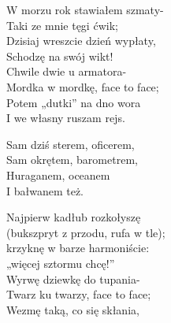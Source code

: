 \begin{text}
    W morzu rok stawiałem szmaty-\\
    Taki ze mnie tęgi ćwik;\\
    Dzisiaj wreszcie dzień wypłaty,\\
    Schodzę na swój wikt!\\
    Chwile dwie u armatora-\\
    Mordka w mordkę, face to face;\\
    Potem „dutki” na dno wora\\
    I we własny ruszam rejs.

    Sam dziś sterem, oficerem,\\
    Sam okrętem, barometrem,\\
    Huraganem, oceanem\\
    I bałwanem też.

    Najpierw kadłub rozkołyszę\\
    (bukszpryt z przodu, rufa w tle);\\
    krzyknę w barze harmoniście:\\
    „więcej sztormu chcę!”\\
    Wyrwę dziewkę do tupania-\\
    Twarz ku twarzy, face to face;\\
    Wezmę taką, co się skłania,
\end{text}
\begin{chord}

\end{chord}